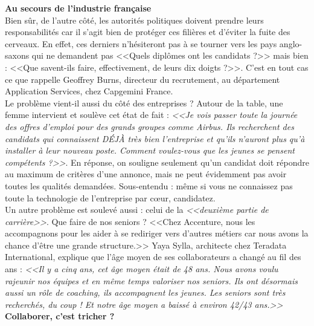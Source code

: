 \documentclass[11pt,twoside,a4paper]{article}
\begin{document}
\textbf{\large Au secours de l'industrie fran\c{c}aise}~\\

Bien s{\^u}r, de l'autre c{\^o}t{\'e}, les autorit{\'e}s politiques doivent prendre leurs responsabilit{\'e}s car il s'agit bien de prot{\'e}ger ces fili{\`e}res et d'{\'e}viter la fuite des cerveaux. En effet, ces derniers n'h{\'e}siteront pas {\`a} se tourner vers les pays anglo-saxons qui ne demandent pas <<Quels dipl{\^o}mes ont les candidats ?>> mais bien : <<Que savent-ils faire, effectivement, de leurs dix doigts ?>>. C'est en tout cas ce que rappelle Geoffrey Burns, directeur du recrutement, au d{\'e}partement Application Services, chez Capgemini France. ~\\

Le probl{\`e}me vient-il aussi du c{\^o}t{\'e} des entreprises ? Autour de la table, une femme intervient et soul{\`e}ve cet {\'e}tat de fait : \emph{<<Je vois passer toute la journ{\'e}e des offres d'emploi pour des grands groupes comme Airbus. Ils recherchent des candidats qui connaissent D{\'E}J{\`A} tr{\`e}s bien l'entreprise et qu'ils n'auront plus qu'{\`a} installer {\`a} leur nouveau poste. Comment voulez-vous que les jeunes se pensent comp{\'e}tents ?>>}. En r{\'e}ponse, on souligne seulement qu'un candidat doit r{\'e}pondre au maximum de crit{\`e}res d'une annonce, mais ne peut {\'e}videmment pas avoir toutes les qualit{\'e}s demand{\'e}es. Sous-entendu : m{\^e}me si vous ne connaissez pas toute la technologie de l'entreprise par c\oe ur, candidatez. ~\\

Un autre probl{\`e}me est soulev{\'e} aussi : celui de la \emph{<<deuxi{\`e}me partie de carri{\`e}re>>}. Que faire de nos seniors ? <<Chez Accenture, nous les accompagnons pour les aider {\`a} se rediriger vers d'autres m{\'e}tiers car nous avons la chance d'{\^e}tre une grande structure.>> Yaya Sylla, architecte chez Teradata International, explique que l'{\^a}ge moyen de ses collaborateurs a chang{\'e} au fil des ans : \emph{<<Il y a cinq ans, cet {\^a}ge moyen {\'e}tait de 48 ans. Nous avons voulu rajeunir nos {\'e}quipes et en m{\^e}me temps valoriser nos seniors. Ils ont d{\'e}sormais aussi un r{\^o}le de coaching, ils accompagnent les jeunes. Les seniors sont tr{\`e}s recherch{\'e}s, du coup ! Et notre {\^a}ge moyen a baiss{\'e} {\`a} environ 42/43 ans.>>} ~\\

\textbf{\large Collaborer, c'est tricher ?}~\\
\end{document}
